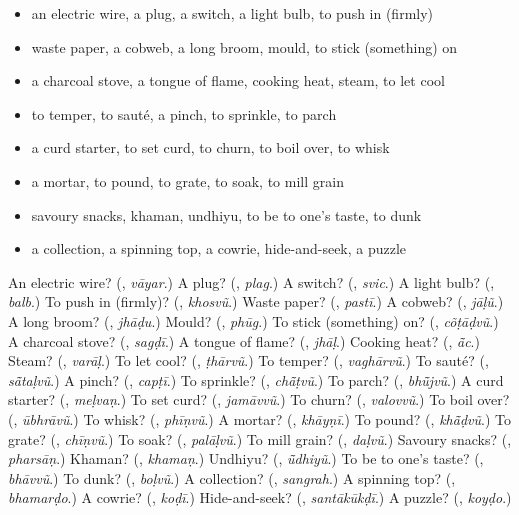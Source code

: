 \begin{itemize}
\raggedright
  \item an electric wire, a plug, a switch, a light bulb, to push in (firmly)
  \item waste paper, a cobweb, a long broom, mould, to stick (something) on
  \item a charcoal stove, a tongue of flame, cooking heat, steam, to let cool
  \item to temper, to sauté, a pinch, to sprinkle, to parch
  \item a curd starter, to set curd, to churn, to boil over, to whisk
  \item a mortar, to pound, to grate, to soak, to mill grain
  \item savoury snacks, khaman, undhiyu, to be to one's taste, to dunk
  \item a collection, a spinning top, a cowrie, hide-and-seek, a puzzle
\end{itemize}

\begin{tcolorbox}[breakable,colback=teal!4,colframe=teal!35!black,title={Before you move on}]
An electric wire? (\textbf{}, \emph{vāyar}.) A plug? (\textbf{}, \emph{plag}.) A switch? (\textbf{}, \emph{svic}.) A light bulb? (\textbf{}, \emph{balb}.) To push in (firmly)? (\textbf{}, \emph{khosvũ}.) Waste paper? (\textbf{}, \emph{pastī}.) A cobweb? (\textbf{}, \emph{jāḷũ}.) A long broom? (\textbf{}, \emph{jhāḍu}.) Mould? (\textbf{}, \emph{phūg}.) To stick (something) on? (\textbf{}, \emph{cõṭāḍvũ}.) A charcoal stove? (\textbf{}, \emph{sagḍī}.) A tongue of flame? (\textbf{}, \emph{jhāḷ}.) Cooking heat? (\textbf{}, \emph{ā̃c}.) Steam? (\textbf{}, \emph{varāḷ}.) To let cool? (\textbf{}, \emph{ṭhārvũ}.) To temper? (\textbf{}, \emph{vaghārvũ}.) To sauté? (\textbf{}, \emph{sā̃taḷvũ}.) A pinch? (\textbf{}, \emph{capṭī}.) To sprinkle? (\textbf{}, \emph{chā̃ṭvũ}.) To parch? (\textbf{}, \emph{bhū̃jvũ}.) A curd starter? (\textbf{}, \emph{meḷvaṇ}.) To set curd? (\textbf{}, \emph{jamāvvũ}.) To churn? (\textbf{}, \emph{valovvũ}.) To boil over? (\textbf{}, \emph{ūbhrāvũ}.) To whisk? (\textbf{}, \emph{phīṇvũ}.) A mortar? (\textbf{}, \emph{khāyṇī}.) To pound? (\textbf{}, \emph{khā̃ḍvũ}.) To grate? (\textbf{}, \emph{chīṇvũ}.) To soak? (\textbf{}, \emph{palāḷvũ}.) To mill grain? (\textbf{}, \emph{daḷvũ}.) Savoury snacks? (\textbf{}, \emph{pharsāṇ}.) Khaman? (\textbf{}, \emph{khamaṇ}.) Undhiyu? (\textbf{}, \emph{ū̃dhiyũ}.) To be to one's taste? (\textbf{}, \emph{bhāvvũ}.) To dunk? (\textbf{}, \emph{boḷvũ}.) A collection? (\textbf{}, \emph{sangrah}.) A spinning top? (\textbf{}, \emph{bhamarḍo}.) A cowrie? (\textbf{}, \emph{koḍī}.) Hide-and-seek? (\textbf{}, \emph{santākūkḍī}.) A puzzle? (\textbf{}, \emph{koyḍo}.)
\end{tcolorbox}
